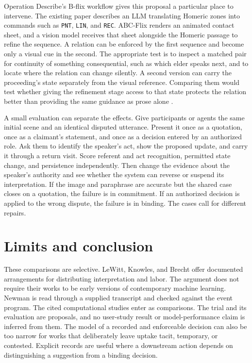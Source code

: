 \documentclass[11pt,letterpaper]{article}
\begin{document}
Operation Describe’s B-flix workflow gives this proposal a particular place to intervene. The existing paper describes an LLM translating Homeric zones into commands such as \texttt{PNT}, \texttt{LIN}, and \texttt{REC}. ABC-Flix renders an animated contact sheet, and a vision model receives that sheet alongside the Homeric passage to refine the sequence. A relation can be enforced by the first sequence and become only a visual cue in the second. The appropriate test is to inspect a matched pair for continuity of something consequential, such as which elder speaks next, and to locate where the relation can change silently. A second version can carry the proceeding’s state separately from the visual reference. Comparing them would test whether giving the refinement stage access to that state protects the relation better than providing the same guidance as prose alone \citep[\S 6 and plate B]{BolterHartsoe}.

A small evaluation can separate the effects. Give participants or agents the same initial scene and an identical disputed utterance. Present it once as a quotation, once as a claimant’s statement, and once as a decision entered by an authorized role. Ask them to identify the speaker’s act, show the proposed update, and carry it through a return visit. Score referent and act recognition, permitted state change, and persistence independently. Then change the evidence about the speaker’s authority and see whether the system can reverse or suspend its interpretation. If the image and paraphrase are accurate but the shared case closes on a quotation, the failure is in commitment. If an authorized decision is applied to the wrong dispute, the failure is in binding. The cases call for different repairs.

\section{Limits and conclusion}

These comparisons are selective. LeWitt, Knowles, and Brecht offer documented arrangements for distributing interpretation and labor. The argument does not require their works to be early versions of contemporary machine learning. Newman is read through a supplied transcript and checked against the event program. The cited computational studies enter as comparisons. The trial and its evaluation are proposals, and no user-study result or model-performance claim is inferred from them. The model of a recorded and enforceable decision can also be too narrow for works that deliberately leave uptake tacit, temporary, or contested. Explicit records are useful where a downstream action depends on distinguishing a suggestion from a binding decision.
\end{document}
